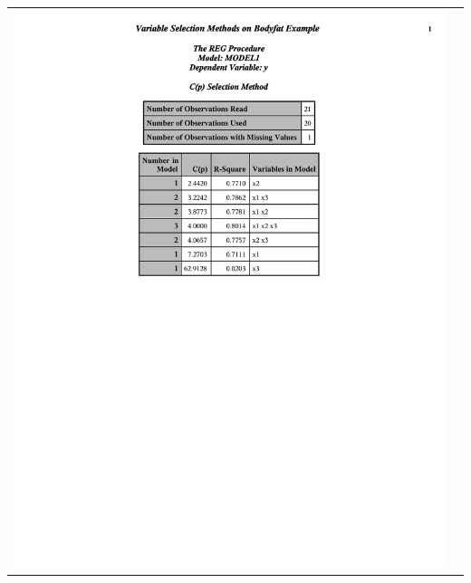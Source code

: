 \documentclass{article}
\begin{document}
\begin{center}
\begin{tabular}{cc}
\includegraphics[page=2,scale=0.6,trim=40mm 30mm 20mm 10mm]{bodyfatexampleselection}\\
\end{tabular}
\begin{tabular}{cc}

\end{tabular}
\end{center}
\end{document}
